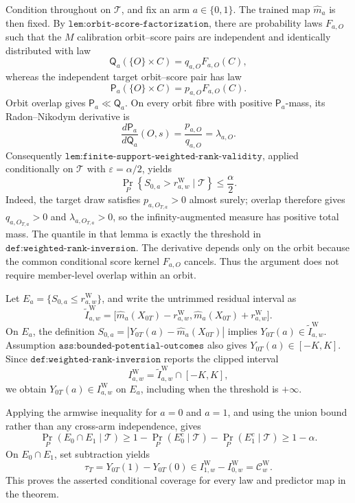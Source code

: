 Condition throughout on \(\mathcal T\), and fix an arm \(a\in\{0,1\}\). The trained map \(\widehat m_a\) is then fixed. By \(\texttt{lem:orbit-score-factorization}\), there are probability laws \(F_{a,O}\) such that the \(M\) calibration orbit--score pairs are independent and identically distributed with law\[\mathsf Q_a(\{O\}\times C)=q_{a,O}F_{a,O}(C),\]whereas the independent target orbit--score pair has law\[\mathsf P_a(\{O\}\times C)=p_{a,O}F_{a,O}(C).\]Orbit overlap gives \(\mathsf P_a\ll\mathsf Q_a\). On every orbit fibre with positive \(\mathsf P_a\)-mass, its Radon--Nikodym derivative is\[\frac{d\mathsf P_a}{d\mathsf Q_a}(O,s)=\frac{p_{a,O}}{q_{a,O}}=\lambda_{a,O}.\]Consequently \(\texttt{lem:finite-support-weighted-rank-validity}\), applied conditionally on \(\mathcal T\) with \(\varepsilon=\alpha/2\), yields\[\Pr_P\!\left\{S_{0,a}>r^{\mathrm W}_{a,w}\mid\mathcal T\right\}\le\frac{\alpha}{2}.\]Indeed, the target draw satisfies \(p_{a,O_{T,a}}>0\) almost surely; overlap therefore gives \(q_{a,O_{T,a}}>0\) and \(\lambda_{a,O_{T,a}}>0\), so the infinity-augmented measure has positive total mass. The quantile in that lemma is exactly the threshold in \(\texttt{def:weighted-rank-inversion}\). The derivative depends only on the orbit because the common conditional score kernel \(F_{a,O}\) cancels. Thus the argument does not require member-level overlap within an orbit.

Let \(E_a=\{S_{0,a}\le r^{\mathrm W}_{a,w}\}\), and write the untrimmed residual interval as\[\widetilde I^{\mathrm W}_{a,w}=\bigl[\widehat m_a(X_{0T})-r^{\mathrm W}_{a,w},\widehat m_a(X_{0T})+r^{\mathrm W}_{a,w}\bigr].\]On \(E_a\), the definition \(S_{0,a}=|Y_{0T}(a)-\widehat m_a(X_{0T})|\) implies \(Y_{0T}(a)\in\widetilde I^{\mathrm W}_{a,w}\). Assumption \(\texttt{ass:bounded-potential-outcomes}\) also gives \(Y_{0T}(a)\in[-K,K]\). Since \(\texttt{def:weighted-rank-inversion}\) reports the clipped interval\[I^{\mathrm W}_{a,w}=\widetilde I^{\mathrm W}_{a,w}\cap[-K,K],\]we obtain \(Y_{0T}(a)\in I^{\mathrm W}_{a,w}\) on \(E_a\), including when the threshold is \(+\infty\).

Applying the armwise inequality for \(a=0\) and \(a=1\), and using the union bound rather than any cross-arm independence, gives\[\Pr_P(E_0\cap E_1\mid\mathcal T)\ge 1-\Pr_P(E_0^c\mid\mathcal T)-\Pr_P(E_1^c\mid\mathcal T)\ge1-\alpha.\]On \(E_0\cap E_1\), set subtraction yields\[\tau_T=Y_{0T}(1)-Y_{0T}(0)\in I^{\mathrm W}_{1,w}-I^{\mathrm W}_{0,w}=\mathcal C^{\mathrm W}_w.\]This proves the asserted conditional coverage for every law and predictor map in the theorem.

